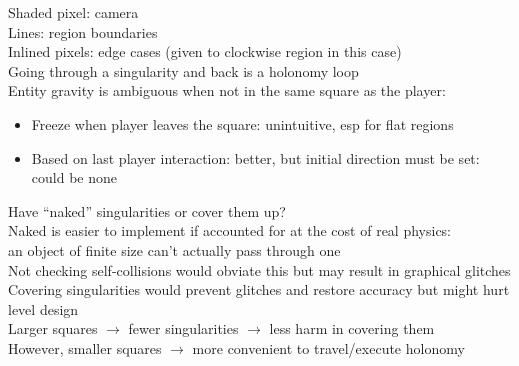 \documentclass{article}
\begin{document}
Shaded pixel: camera \\
Lines: region boundaries \\
Inlined pixels: edge cases (given to clockwise region in this case) \\
Going through a singularity and back is a holonomy loop \\
Entity gravity is ambiguous when not in the same square as the player:
\begin{itemize}
  \item
    Freeze when player leaves the square: unintuitive, esp for flat regions
  \item
    Based on last player interaction: better, but initial direction must be set:
    could be none
\end{itemize}
Have ``naked'' singularities or cover them up? \\
Naked is easier to implement if accounted for
at the cost of real physics: \\
an object of finite size can't actually pass through one \\
Not checking self-collisions would obviate this
but may result in graphical glitches \\
Covering singularities would prevent glitches and restore accuracy
but might hurt level design \\
Larger squares $\rightarrow$ fewer singularities $\rightarrow$ less harm in covering them \\
However, smaller squares $\rightarrow$ more convenient to travel/execute holonomy \\
\end{document}
